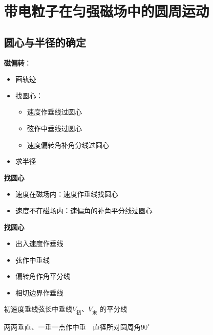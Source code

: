\section{带电粒子在匀强磁场中的圆周运动}
\subsection{圆心与半径的确定}
\textbf{磁偏转}：
\begin{itemize}
\item 画轨迹
\item 找圆心：
\begin{itemize}
\item 速度作垂线过圆心
\item 弦作中垂线过圆心
\item 速度偏转角补角分线过圆心
\end{itemize}
\item 求半径
\end{itemize}

\textbf{找圆心}
\begin{itemize}
\item 速度在磁场内：速度作垂线找圆心
\item 速度不在磁场内：速偏角的补角平分线过圆心
\end{itemize}

\textbf{找圆心}
\begin{itemize}
\item 出入速度作垂线 %
\item 弦作中垂线 %
\item 偏转角作角平分线
\item 相切边界作垂线
\end{itemize}

初速度垂线\quad 弦长中垂线\quad $V_{\text{初}}$、$V_{\text{末}}$ 的平分线\quad {}

两两垂直、一垂一点作中垂\ \ 直径所对圆周角$90^\circ$



